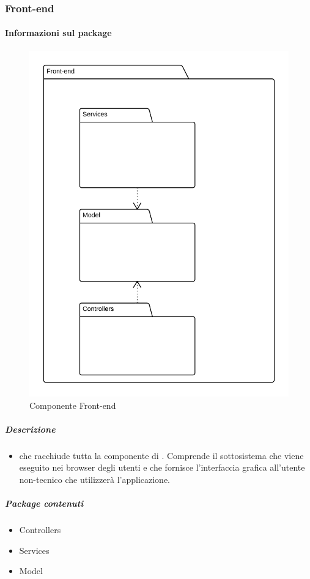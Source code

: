 
  \subsubsection{Front-end}
  \paragraph{Informazioni sul package}
    \begin{figure}[H] 
      \begin{center}
        \includegraphics[width=\textwidth]{uml/package/Front-end.png}
        \caption{Componente Front-end}
      \end{center}  
    \end{figure} 
  \subparagraph{Descrizione} 
    \begin{itemize}
    \item[]  che racchiude tutta la componente di . Comprende il sottosistema che viene eseguito nei browser degli utenti e che fornisce l'interfaccia grafica all'utente non-tecnico che utilizzerà l'applicazione.
    \end{itemize} 
    \subparagraph{Package contenuti} 
    \begin{itemize}
        \item Controllers
        \item Services
        \item Model
    \end{itemize}
